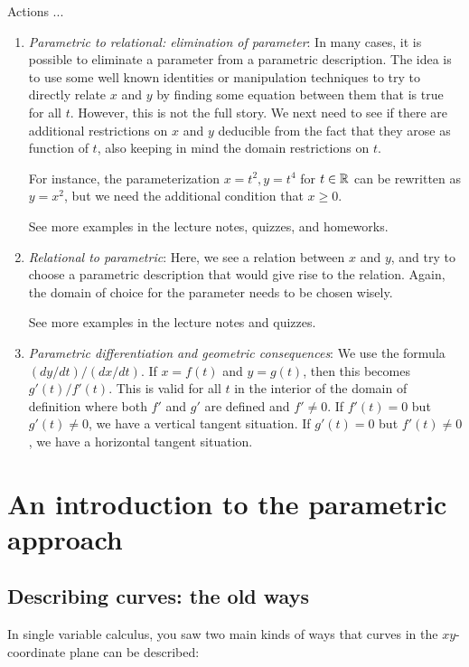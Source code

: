 \documentclass[10pt]{amsart}
\begin{document}
Actions ...

\begin{enumerate}
\item {\em Parametric to relational: elimination of parameter}: In
  many cases, it is possible to eliminate a parameter from a
  parametric description. The idea is to use some well known
  identities or manipulation techniques to try to directly relate $x$
  and $y$ by finding some equation between them that is true for all
  $t$. However, this is not the full story. We next need to see if
  there are additional restrictions on $x$ and $y$ deducible from the
  fact that they arose as function of $t$, also keeping in mind the
  domain restrictions on $t$.

  For instance, the parameterization $x = t^2, y = t^4$ for $t \in \mathbb{R}$
  can be rewritten as $y = x^2$, but we need the additional condition
  that $x \ge 0$.

  See more examples in the lecture notes, quizzes, and homeworks.
\item {\em Relational to parametric}: Here, we see a relation between
  $x$ and $y$, and try to choose a parametric description that would
  give rise to the relation. Again, the domain of choice for the
  parameter needs to be chosen wisely.

  See more examples in the lecture notes and quizzes.
\item {\em Parametric differentiation and geometric consequences}: We
  use the formula $(dy/dt)/(dx/dt)$. If $x = f(t)$ and $y = g(t)$,
  then this becomes $g'(t)/f'(t)$. This is valid for all $t$ in the
  interior of the domain of definition where both $f'$ and $g'$ are
  defined and $f' \ne 0$. If $f'(t) = 0$ but $g'(t) \ne 0$, we have a
  vertical tangent situation. If $g'(t) = 0$ but $f'(t) \ne 0$, we
  have a horizontal tangent situation.
\end{enumerate}

\section{An introduction to the parametric approach}

\subsection{Describing curves: the old ways}

In single variable calculus, you saw two main kinds of ways that
curves in the $xy$-coordinate plane can be described:
\end{document}
